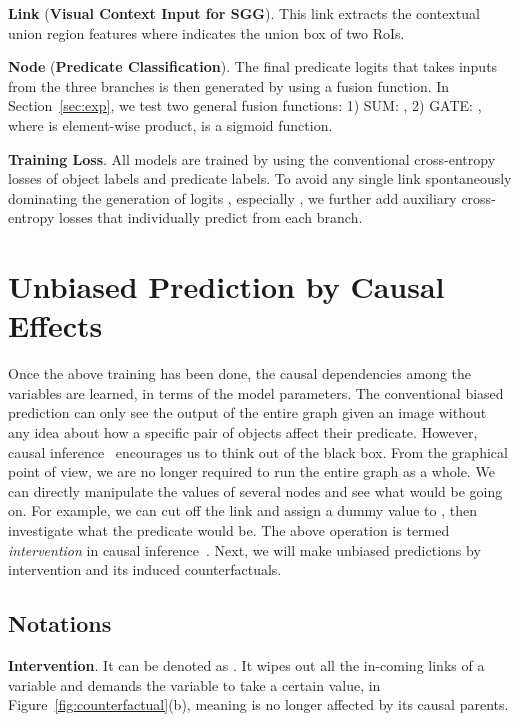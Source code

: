 \documentclass[10pt,twocolumn,letterpaper]{article}
\begin{document}
\noindent\textbf{Link}  (\textbf{Visual Context Input for SGG}). This link extracts the contextual union region features  where  indicates the union box of two RoIs.

\noindent\textbf{Node}  (\textbf{Predicate Classification}). The final predicate logits  that takes inputs from the three branches is then generated by using a fusion function. In Section~\ref{sec:exp}, we test two general fusion functions: 1) SUM: , 2) GATE:  , where  is element-wise product,  is a sigmoid function.

\noindent\textbf{Training Loss}. All models are trained by using the conventional cross-entropy losses of object labels and predicate labels. To avoid any single link spontaneously dominating the generation of logits , especially , we further add auxiliary cross-entropy losses that individually predict  from each branch. 

\section{Unbiased Prediction by Causal Effects}
\label{sec:unbiased_pred}
Once the above training has been done, the causal dependencies among the variables are learned, in terms of the model parameters. The conventional biased prediction can only see the output of the entire graph given an image  without any idea about how a specific pair of objects affect their predicate. However, causal inference~\cite{Judea2018thebookofwhy} encourages us to think out of the black box. From the graphical point of view, we are no longer required to run the entire graph as a whole. We can directly manipulate the values of several nodes and see what would be going on. For example, we can cut off the link  and assign a dummy value to , then investigate what the predicate would be. The above operation is termed \emph{intervention} in causal inference~\cite{pearl2016causal}. Next, we will make unbiased predictions by intervention and its induced counterfactuals.

\vspace{-0.05in}
\subsection{Notations}
\vspace{-0.05in}
\noindent\textbf{Intervention}. It can be denoted as . It wipes out all the in-coming links of a variable and demands the variable to take a certain value, \eg  in Figure~\ref{fig:counterfactual}(b), meaning  is no longer affected by its causal parents. 
\end{document}
